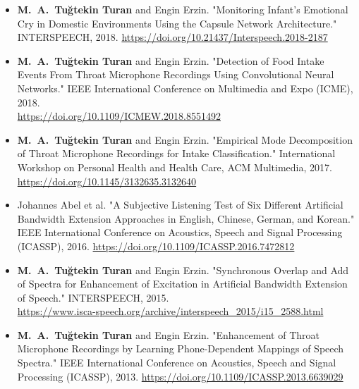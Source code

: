 \documentclass[margin, 10pt]{res} %
\begin{document}
\begin{resume}
\begin{itemize}[leftmargin=*]
    \item \textbf{M.~A.~Tu\u{g}tekin Turan} and Engin Erzin. "Monitoring Infant's Emotional Cry in Domestic Environments Using the Capsule Network Architecture." INTERSPEECH, 2018. \hspace{.1em} \url{https://doi.org/10.21437/Interspeech.2018-2187}


    \item \textbf{M.~A.~Tu\u{g}tekin Turan} and Engin Erzin. "Detection of Food Intake Events From Throat Microphone Recordings Using Convolutional Neural Networks." IEEE International Conference on Multimedia and Expo (ICME), 2018. \\ \url{https://doi.org/10.1109/ICMEW.2018.8551492}

    \item \textbf{M.~A.~Tu\u{g}tekin Turan} and Engin Erzin. "Empirical Mode Decomposition of Throat Microphone Recordings for Intake Classification." International Workshop on Personal Health and Health Care, ACM Multimedia, 2017. \\ \url{https://doi.org/10.1145/3132635.3132640}

    \item Johannes Abel et al. "A Subjective Listening Test of Six Different Artificial Bandwidth Extension Approaches in English, Chinese, German, and Korean." IEEE International Conference on Acoustics, Speech and Signal Processing (ICASSP), 2016. \hspace{.1em} \url{https://doi.org/10.1109/ICASSP.2016.7472812}

    \item \textbf{M.~A.~Tu\u{g}tekin Turan} and Engin Erzin. "Synchronous Overlap and Add of Spectra for Enhancement of Excitation in Artificial Bandwidth Extension of Speech." INTERSPEECH, 2015. \\ \url{https://www.isca-speech.org/archive/interspeech_2015/i15_2588.html}

    \item \textbf{M.~A.~Tu\u{g}tekin Turan} and Engin Erzin. "Enhancement of Throat Microphone Recordings by Learning Phone-Dependent Mappings of Speech Spectra." IEEE International Conference on Acoustics, Speech and Signal Processing (ICASSP), 2013. \hspace{.1em} \url{https://doi.org/10.1109/ICASSP.2013.6639029}


\end{itemize}
\end{resume}
\end{document}
